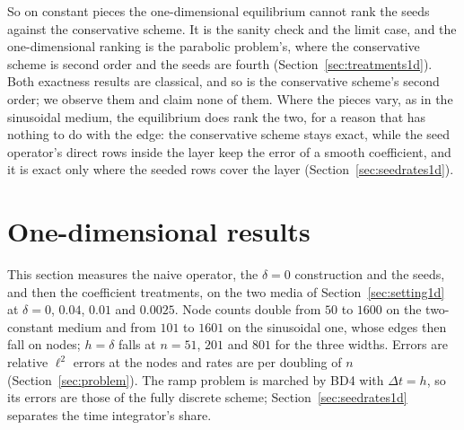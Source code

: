 \documentclass[11pt]{amsart}
\theoremstyle{definition}
\theoremstyle{remark}
\begin{document}
So on constant pieces the one-dimensional equilibrium cannot rank the seeds
against the conservative scheme. It is the sanity check and the limit
case, and the one-dimensional ranking is the parabolic problem's, where
the conservative scheme is second order and the seeds are fourth
(Section~\ref{sec:treatments1d}). Both exactness results are classical,
and so is the conservative scheme's second order; we observe them and claim
none of them. Where the pieces vary, as in the sinusoidal medium, the
equilibrium does rank the two, for a reason that has nothing to do with
the edge: the conservative scheme stays exact, while the seed operator's
direct rows inside the layer keep the error of a smooth coefficient, and
it is exact only where the seeded rows cover the layer
(Section~\ref{sec:seedrates1d}).

\section{One-dimensional results}
\label{sec:results1d}
This section measures the naive operator, the $\delta = 0$ construction and
the seeds, and then the coefficient treatments, on the two media of
Section~\ref{sec:setting1d} at $\delta = 0$, $0.04$, $0.01$ and $0.0025$.
Node counts double from $50$ to $1600$ on the two-constant medium and from
$101$ to $1601$ on the sinusoidal one, whose edges then fall on nodes;
$h = \delta$ falls at $n = 51$, $201$ and $801$ for the three widths. Errors
are relative $\ell^2$ errors at the nodes and rates are per doubling of $n$
(Section~\ref{sec:problem}). The ramp problem is marched by BD4 with
$\Delta t = h$, so its errors are those of the fully discrete scheme;
Section~\ref{sec:seedrates1d} separates the time integrator's share.
\end{document}
